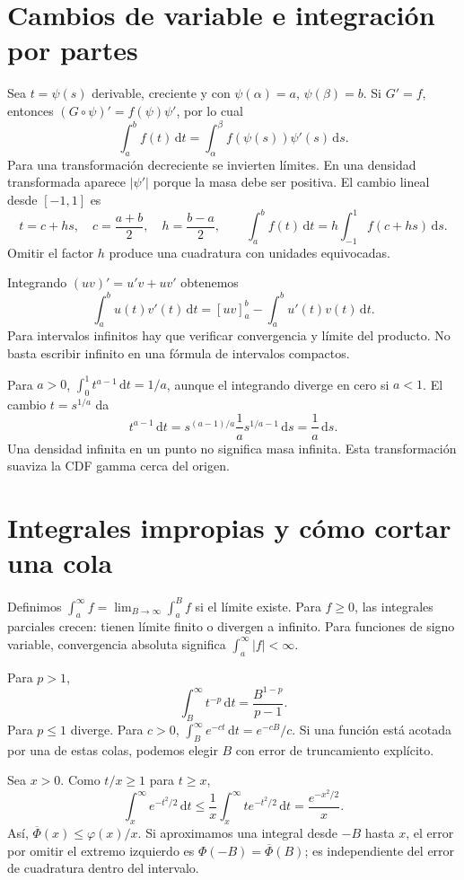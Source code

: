 \documentclass[11pt,a4paper]{article}
\newcommand{\dd}{\,\mathrm d}
\theoremstyle{definition}
\newcommand{\ph}{\varphi}
\newcommand{\Q}{\overline\Phi}
\begin{document}
\section{Cambios de variable e integración por partes}
Sea $t=\psi(s)$ derivable, creciente y con $\psi(\alpha)=a$, $\psi(\beta)=b$. Si $G'=f$, entonces $(G\circ\psi)'=f(\psi)\psi'$, por lo cual
\[
\int_a^b f(t)\dd t=\int_\alpha^\beta f(\psi(s))\psi'(s)\dd s.
\]
Para una transformación decreciente se invierten límites. En una densidad transformada aparece $|\psi'|$ porque la masa debe ser positiva. El cambio lineal desde $[-1,1]$ es
\[
t=c+hs,\quad c=\frac{a+b}2,\quad h=\frac{b-a}2,\qquad
\int_a^b f(t)\dd t=h\int_{-1}^1 f(c+hs)\dd s.
\]
Omitir el factor $h$ produce una cuadratura con unidades equivocadas.

Integrando $(uv)'=u'v+uv'$ obtenemos
\[
\int_a^b u(t)v'(t)\dd t=[uv]_a^b-\int_a^b u'(t)v(t)\dd t.
\]
Para intervalos infinitos hay que verificar convergencia y límite del producto. No basta escribir infinito en una fórmula de intervalos compactos.

\begin{ejemplo}
Para $a>0$, $\int_0^1t^{a-1}\dd t=1/a$, aunque el integrando diverge en cero si $a<1$. El cambio $t=s^{1/a}$ da
\[
t^{a-1}\dd t=s^{(a-1)/a}\frac1a s^{1/a-1}\dd s=\frac1a\dd s.
\]
Una densidad infinita en un punto no significa masa infinita. Esta transformación suaviza la CDF gamma cerca del origen.
\end{ejemplo}

\section{Integrales impropias y cómo cortar una cola}
Definimos $\int_a^\infty f=\lim_{B\to\infty}\int_a^B f$ si el límite existe. Para $f\ge0$, las integrales parciales crecen: tienen límite finito o divergen a infinito. Para funciones de signo variable, convergencia absoluta significa $\int_a^\infty|f|<\infty$.

Para $p>1$,
\[
\int_B^\infty t^{-p}\dd t=\frac{B^{1-p}}{p-1}.
\]
Para $p\le1$ diverge. Para $c>0$, $\int_B^\infty e^{-ct}\dd t=e^{-cB}/c$. Si una función está acotada por una de estas colas, podemos elegir $B$ con error de truncamiento explícito.

Sea $x>0$. Como $t/x\ge1$ para $t\ge x$,
\[
\int_x^\infty e^{-t^2/2}\dd t
\le\frac1x\int_x^\infty t e^{-t^2/2}\dd t
=\frac{e^{-x^2/2}}x.
\]
Así, $\Q(x)\le\ph(x)/x$. Si aproximamos una integral desde $-B$ hasta $x$, el error por omitir el extremo izquierdo es $\Phi(-B)=\Q(B)$; es independiente del error de cuadratura dentro del intervalo.
\end{document}
